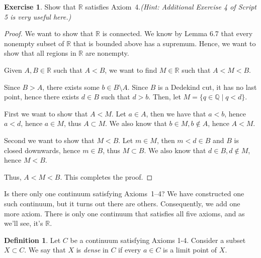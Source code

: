 \documentclass[11pt]{article}
\newcommand{\bbQ}{\mathbb{Q}}
\newcommand{\bbR}{\mathbb{R}}
\theoremstyle{definition}
\newtheorem{definition}[theorem]{Definition}
\newtheorem{exercise}[theorem]{Exercise}
\numberwithin{equation}{subsection}
\begin{document}
\begin{exercise}
	Show that $\bbR$ satisfies Axiom~4.{\em  (Hint: Additional Exercise 4 of Script 5 is very useful here.)} 

    
\begin{proof}
We want to show that $\bbR$ is connected. We know by Lemma 6.7 that every nonempty subset of $\bbR$ that is bounded above has a supremum. Hence, we want to show that all regions in $\bbR$ are nonempty.

Given $A,B \in \bbR$ such that $A<B$, we want to find $M \in \bbR$ such that $A<M<B$. 

Since $B>A$, there exists some $b \in B \setminus A$. Since $B$ is a Dedekind cut, it has no last point, hence there exists $d \in B$ such that $d >b$. Then, let $M = \{q \in \bbQ \mid q<d\}$.

First we want to show that $A<M$. Let $a \in A$, then we have that $a<b$, hence $a<d$, hence $a \in M$, thus $A \subset M$. We also know that $b \in M, b \notin A$, hence $A <M$.

Second we want to show that $M<B$. Let $m \in M$, then $m <d \in B$ and $B$ is closed downwards, hence $m \in B$, thus $M\subset B$. We also know that $d \in B, d \notin M$, hence $M<B$.

Thus, $A<M<B$. This completes the proof.

\renewcommand\qedsymbol{QED}
\end{proof}

\end{exercise}





Is there only one continuum satisfying Axioms~1--4? We have constructed one such continuum, but it turns out there are others. Consequently, we add one more axiom. There is only one continuum that satisfies all five axioms, and as we'll see, it's $\bbR$.


\begin{definition}
Let $C$ be a continuum satisfying Axioms 1-4.	Consider a subset $X \subset C.$ We say that $X$ is \emph{dense} in $C$ if every $a \in C$ is a limit point of $X$.
\end{definition}
\end{document}

